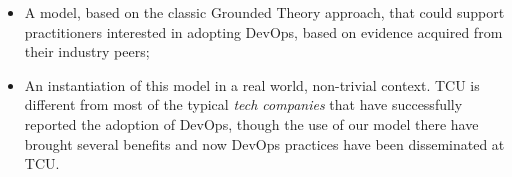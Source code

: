 \begin{itemize}
\item A model, based on the classic Grounded Theory approach, that could support practitioners interested in adopting DevOps,
      based on evidence acquired from their industry peers;
\item An instantiation of this model in a real world, non-trivial context. TCU is different from most of the typical \emph{tech companies}
that have successfully reported the adoption of DevOps, though the use of our model there have brought several benefits and
now DevOps practices have been disseminated at TCU.
\end{itemize}









%



